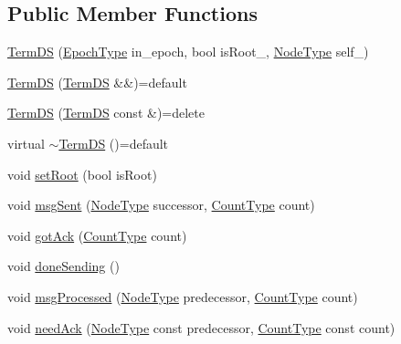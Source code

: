 \subsection*{Public Member Functions}
\begin{DoxyCompactItemize}
\item 
\hyperlink{structvt_1_1term_1_1ds_1_1_term_d_s_a1873de7f6d3009bd997c64eefb46d9b5}{Term\+DS} (\hyperlink{namespacevt_a81d11b28122d43bf9834577e4a06440f}{Epoch\+Type} in\+\_\+epoch, bool is\+Root\+\_\+, \hyperlink{namespacevt_a866da9d0efc19c0a1ce79e9e492f47e2}{Node\+Type} self\+\_\+)
\item 
\hyperlink{structvt_1_1term_1_1ds_1_1_term_d_s_a01ffd2a7fc4410599708c3fcb5998743}{Term\+DS} (\hyperlink{structvt_1_1term_1_1ds_1_1_term_d_s}{Term\+DS} \&\&)=default
\item 
\hyperlink{structvt_1_1term_1_1ds_1_1_term_d_s_a513d27464e9c231a24a755bf80a93dcd}{Term\+DS} (\hyperlink{structvt_1_1term_1_1ds_1_1_term_d_s}{Term\+DS} const \&)=delete
\item 
virtual \hyperlink{structvt_1_1term_1_1ds_1_1_term_d_s_ab7990eff9ce88551b3e2133f1664593a}{$\sim$\+Term\+DS} ()=default
\item 
void \hyperlink{structvt_1_1term_1_1ds_1_1_term_d_s_a684dd240eeab7ef4c2d1477840276f28}{set\+Root} (bool is\+Root)
\item 
void \hyperlink{structvt_1_1term_1_1ds_1_1_term_d_s_af03262950f250a7ebceb7079d3113a58}{msg\+Sent} (\hyperlink{namespacevt_a866da9d0efc19c0a1ce79e9e492f47e2}{Node\+Type} successor, \hyperlink{structvt_1_1term_1_1ds_1_1_term_d_s_a54f4ebd7e1ecb59c32c0f5b03ef9f20b}{Count\+Type} count)
\item 
void \hyperlink{structvt_1_1term_1_1ds_1_1_term_d_s_a6fcd87a189c046c48c341f39f9ea0b69}{got\+Ack} (\hyperlink{structvt_1_1term_1_1ds_1_1_term_d_s_a54f4ebd7e1ecb59c32c0f5b03ef9f20b}{Count\+Type} count)
\item 
void \hyperlink{structvt_1_1term_1_1ds_1_1_term_d_s_a9723c6b5db4318277329570e0974e1c7}{done\+Sending} ()
\item 
void \hyperlink{structvt_1_1term_1_1ds_1_1_term_d_s_a16ad493d9d01db734c20ea9a55b0ffc5}{msg\+Processed} (\hyperlink{namespacevt_a866da9d0efc19c0a1ce79e9e492f47e2}{Node\+Type} predecessor, \hyperlink{structvt_1_1term_1_1ds_1_1_term_d_s_a54f4ebd7e1ecb59c32c0f5b03ef9f20b}{Count\+Type} count)
\item 
void \hyperlink{structvt_1_1term_1_1ds_1_1_term_d_s_ae1f49e96bb1903570e1639685b816388}{need\+Ack} (\hyperlink{namespacevt_a866da9d0efc19c0a1ce79e9e492f47e2}{Node\+Type} const predecessor, \hyperlink{structvt_1_1term_1_1ds_1_1_term_d_s_a54f4ebd7e1ecb59c32c0f5b03ef9f20b}{Count\+Type} const count)

\end{DoxyCompactItemize}
